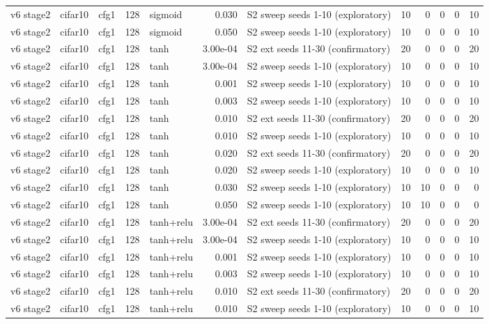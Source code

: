 \begin{table}[htbp]
{\begin{tabular}{@{}lllrlrlrrrrr@{}}
v6 stage2 & cifar10 & cfg1 & 128 & sigmoid & 0.030 & S2 sweep seeds 1-10 (exploratory) & 10 & 0 & 0 & 0 & 10 \\
v6 stage2 & cifar10 & cfg1 & 128 & sigmoid & 0.050 & S2 sweep seeds 1-10 (exploratory) & 10 & 0 & 0 & 0 & 10 \\
v6 stage2 & cifar10 & cfg1 & 128 & tanh & 3.00e-04 & S2 ext seeds 11-30 (confirmatory) & 20 & 0 & 0 & 0 & 20 \\
v6 stage2 & cifar10 & cfg1 & 128 & tanh & 3.00e-04 & S2 sweep seeds 1-10 (exploratory) & 10 & 0 & 0 & 0 & 10 \\
v6 stage2 & cifar10 & cfg1 & 128 & tanh & 0.001 & S2 sweep seeds 1-10 (exploratory) & 10 & 0 & 0 & 0 & 10 \\
v6 stage2 & cifar10 & cfg1 & 128 & tanh & 0.003 & S2 sweep seeds 1-10 (exploratory) & 10 & 0 & 0 & 0 & 10 \\
v6 stage2 & cifar10 & cfg1 & 128 & tanh & 0.010 & S2 ext seeds 11-30 (confirmatory) & 20 & 0 & 0 & 0 & 20 \\
v6 stage2 & cifar10 & cfg1 & 128 & tanh & 0.010 & S2 sweep seeds 1-10 (exploratory) & 10 & 0 & 0 & 0 & 10 \\
v6 stage2 & cifar10 & cfg1 & 128 & tanh & 0.020 & S2 ext seeds 11-30 (confirmatory) & 20 & 0 & 0 & 0 & 20 \\
v6 stage2 & cifar10 & cfg1 & 128 & tanh & 0.020 & S2 sweep seeds 1-10 (exploratory) & 10 & 0 & 0 & 0 & 10 \\
v6 stage2 & cifar10 & cfg1 & 128 & tanh & 0.030 & S2 sweep seeds 1-10 (exploratory) & 10 & 10 & 0 & 0 & 0 \\
v6 stage2 & cifar10 & cfg1 & 128 & tanh & 0.050 & S2 sweep seeds 1-10 (exploratory) & 10 & 10 & 0 & 0 & 0 \\
v6 stage2 & cifar10 & cfg1 & 128 & tanh+relu & 3.00e-04 & S2 ext seeds 11-30 (confirmatory) & 20 & 0 & 0 & 0 & 20 \\
v6 stage2 & cifar10 & cfg1 & 128 & tanh+relu & 3.00e-04 & S2 sweep seeds 1-10 (exploratory) & 10 & 0 & 0 & 0 & 10 \\
v6 stage2 & cifar10 & cfg1 & 128 & tanh+relu & 0.001 & S2 sweep seeds 1-10 (exploratory) & 10 & 0 & 0 & 0 & 10 \\
v6 stage2 & cifar10 & cfg1 & 128 & tanh+relu & 0.003 & S2 sweep seeds 1-10 (exploratory) & 10 & 0 & 0 & 0 & 10 \\
v6 stage2 & cifar10 & cfg1 & 128 & tanh+relu & 0.010 & S2 ext seeds 11-30 (confirmatory) & 20 & 0 & 0 & 0 & 20 \\
v6 stage2 & cifar10 & cfg1 & 128 & tanh+relu & 0.010 & S2 sweep seeds 1-10 (exploratory) & 10 & 0 & 0 & 0 & 10 \\

\end{tabular}}
\end{table}
